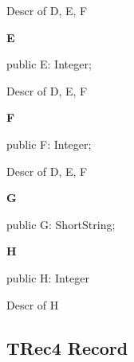 \documentclass{report}
\newif\ifpdf
\begin{document}
\begin{list}{}
\par Descr of D, E, F\label{ok_record_case_parsing.TRec3-E}
\item[\textbf{E}\hfill]
\ifpdf
\begin{flushleft}
\fi
\begin{ttfamily}
public E: Integer;\end{ttfamily}

\ifpdf
\end{flushleft}
\fi


\par Descr of D, E, F\label{ok_record_case_parsing.TRec3-F}
\item[\textbf{F}\hfill]
\ifpdf
\begin{flushleft}
\fi
\begin{ttfamily}
public F: Integer;\end{ttfamily}

\ifpdf
\end{flushleft}
\fi


\par Descr of D, E, F\label{ok_record_case_parsing.TRec3-G}
\item[\textbf{G}\hfill]
\ifpdf
\begin{flushleft}
\fi
\begin{ttfamily}
public G: ShortString;\end{ttfamily}

\ifpdf
\end{flushleft}
\fi


\par  \label{ok_record_case_parsing.TRec3-H}
\item[\textbf{H}\hfill]
\ifpdf
\begin{flushleft}
\fi
\begin{ttfamily}
public H: Integer\end{ttfamily}

\ifpdf
\end{flushleft}
\fi


\par Descr of H\end{list}
\ifpdf
\subsection*{\large{\textbf{TRec4 Record}}\normalsize\hspace{1ex}\hrulefill}
\else
\subsection*{TRec4 Record}
\fi
\label{ok_record_case_parsing.TRec4}
\end{document}
